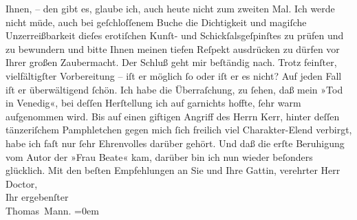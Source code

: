 \begin{ledgroupsized}[t]{13cm}
                    Ihnen, – den gibt es, glaube ich, auch heute {\pb}nicht zum zweiten Mal. Ich werde
                    nicht müde, auch bei geſchloſſenem Buche die Dichtigkeit und magiſche
                    Unzerreißbarkeit dieſes erotiſchen Kunſt- und Schickſalsgeſpinſtes zu prüfen und
                    zu bewundern und bitte Ihnen meinen tiefen Reſpekt ausdrücken zu dürfen vor
                    Ihrer großen Zaubermacht. Der Schluß geht mir beſtändig nach. Trotz feinſter,
                    vielfältigſter Vorbereitung – iſt er möglich ſo oder iſt er es nicht? Auf jeden
                    Fall iſt er überwältigend ſchön.\pend
           \pstart
           Ich habe die Überraſchung, zu ſehen, daß mein »Tod
                        in Venedig«, bei deſſen Herſtellung ich {\pb}auf garnichts hoffte, ſehr warm
                    aufgenommen wird. Bis auf einen giftigen Angriff des Herrn Kerr, hinter deſſen tänzeriſchem Pamphletchen gegen mich ſich freilich viel
                    Charakter-Elend verbirgt, habe ich faſt nur ſehr Ehrenvolles darüber gehört. Und
                    daß die erſte Beruhigung vom Autor der »Frau
                        Beate« kam, darüber bin ich nun wieder beſonders glücklich.\pend
           \pstart
           Mit den beſten Empfehlungen an Sie und Ihre Gattin, verehrter Herr Doctor,{\\[\baselineskip]}Ihr ergebenſter{\\[\baselineskip]}\spacefill\mbox{Thomas Mann.}\pend
           \leftskip=0em{}\endnumbering{}\end{ledgroupsized}  \newcommand{\dateiname}{L02139}\newcommand{\titel}{Thomas Mann an Arthur Schnitzler, 22. 5. 1913}\newcommand{\editorInnen}{Martin Anton Müller und Gerd-Hermann Susen}
      
